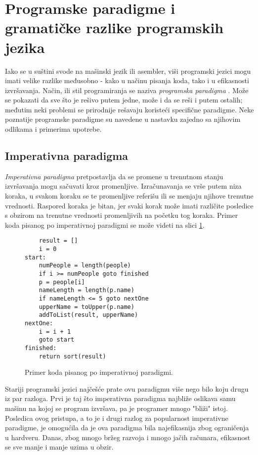 \section{Programske paradigme i gramatičke razlike programskih jezika}
\label{sec:Paradigms}

Iako se u suštini svode na mašinski jezik ili asembler, viši programski jezici mogu imati velike razlike međusobno - kako u načinu pisanja koda, tako i u efikasnosti izvršavanja. Način, ili stil programiranja se naziva \emph{programska paradigma} \cite{ProgrammingParadigms}. Može se pokazati da sve što je rešivo putem jedne, može i da se reši i putem ostalih; međutim neki problemi se prirodnije rešavaju koristeći specifične paradigme. Neke poznatije programske paradigme su navedene u nastavku zajedno sa njihovim odlikama i primerima upotrebe.

\subsection{Imperativna paradigma}
\label{subsec:ParadigmImperative}

\emph{Imperativna paradigma} pretpostavlja da se promene u trenutnom stanju izvršavanja mogu sačuvati kroz promenljive. Izračunavanja se vrše putem niza koraka, u svakom koraku se te promenljive referišu ili se menjaju njihove trenutne vrednosti. Raspored koraka je bitan, jer svaki korak može imati različite posledice s obzirom na trenutne vrednosti promenljivih na početku tog koraka. Primer koda pisanog po imperativnoj paradigmi se može videti na slici \ref{fig:ParadigmImperative}.

\begin{figure}[h!]
\begin{lstlisting}
    result = []
    i = 0
start:
    numPeople = length(people)
    if i >= numPeople goto finished
    p = people[i]
    nameLength = length(p.name)
    if nameLength <= 5 goto nextOne
    upperName = toUpper(p.name)
    addToList(result, upperName)
nextOne:
    i = i + 1
    goto start
finished:
    return sort(result)
\end{lstlisting}
\caption{Primer koda pisanog po imperativnoj paradigmi.}
\label{fig:ParadigmImperative}
\end{figure}

Stariji programski jezici najčešće prate ovu paradigmu više nego bilo koju drugu iz par razloga. Prvi je taj što imperativna paradigma najbliže oslikava samu mašinu na kojoj se program izvršava, pa je programer mnogo "bliži" istoj. Posledica ovog pristupa, a to je i drugi razlog za popularnost imperativne paradigme, je omogućila da je ova paradigma bila najefikasnija zbog ograničenja u hardveru. Danas, zbog mnogo bržeg razvoja i mnogo jačih računara, efikasnost se sve manje i manje uzima u obzir.

